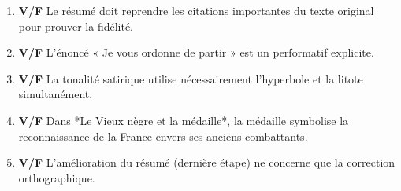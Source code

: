 \documentclass[11pt]{article}
\begin{document}
\begin{exercice}
\begin{enumerate}
    \item \textbf{V/F} Le résumé doit reprendre les citations importantes du texte original pour prouver la fidélité.
    \item \textbf{V/F} L'énoncé « Je vous ordonne de partir » est un performatif explicite.
    \item \textbf{V/F} La tonalité satirique utilise nécessairement l'hyperbole et la litote simultanément.
    \item \textbf{V/F} Dans *Le Vieux nègre et la médaille*, la médaille symbolise la reconnaissance de la France envers ses anciens combattants.
    \item \textbf{V/F} L'amélioration du résumé (dernière étape) ne concerne que la correction orthographique.
\end{enumerate}
\end{exercice}
\end{document}
